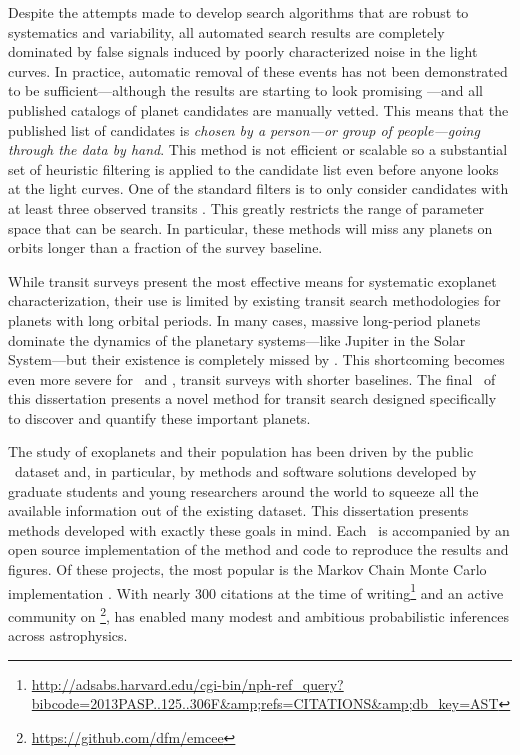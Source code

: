 Despite the attempts made to develop search algorithms that are robust to
systematics and variability, all automated search results are completely
dominated by false signals induced by poorly characterized noise in the light
curves.
In practice, automatic removal of these events has not been demonstrated to be
sufficient---although the results are starting to look promising
\citep{Jenkins:2014}---and all published catalogs of planet candidates are
manually vetted.
This means that the published list of candidates is \emph{chosen by a
person---or group of people---going through the data by hand}.
This method is not efficient or scalable so a substantial set of heuristic
filtering is applied to the candidate list even before anyone looks at the
light curves.
One of the standard filters is to only consider candidates with at least three
observed transits \citep[for example][]{Petigura:2013, Burke:2014, Rowe:2015}.
This greatly restricts the range of parameter space that can be search.
In particular, these methods will miss any planets on orbits longer than a
fraction of the survey baseline.

While transit surveys present the most effective means for systematic
exoplanet characterization, their use is limited by existing transit search
methodologies for planets with long orbital periods.
In many cases, massive long-period planets dominate the dynamics of the
planetary systems---like Jupiter in the Solar System---but their existence is
completely missed by \kepler.
This shortcoming becomes even more severe for \KT\ and \tess, transit surveys
with shorter baselines.
The final \chapname\ of this dissertation presents a novel method for transit
search designed specifically to discover and quantify these important planets.

The study of exoplanets and their population has been driven by the public
\kepler\ dataset and, in particular, by methods and software solutions
developed by graduate students and young researchers around the world to
squeeze all the available information out of the existing dataset.
This dissertation presents methods developed with exactly these goals in mind.
Each \chapname\ is accompanied by an open source implementation of the method
and code to reproduce the results and figures.
Of these projects, the most popular is the Markov Chain Monte Carlo
implementation  \citep[][and
]{Foreman-Mackey:2013}.
With nearly 300 citations at the time of
writing\footnote{\url{http://adsabs.harvard.edu/cgi-bin/nph-ref_query?bibcode=2013PASP..125..306F&amp;refs=CITATIONS&amp;db_key=AST}}
and an active community on
\footnote{\url{https://github.com/dfm/emcee}}, 
has enabled many modest and ambitious probabilistic inferences across
astrophysics.

